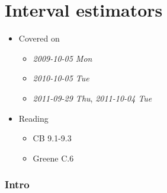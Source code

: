 
\part*{Interval estimators}%

\begin{itemize}
\item Covered on
\begin{itemize}
\item \textit{2009-10-05 Mon}
\item \textit{2010-10-05 Tue}
\item \textit{2011-09-29 Thu}, \textit{2011-10-04 Tue}
\end{itemize}
\item Reading
\begin{itemize}
\item CB 9.1-9.3
\item Greene C.6
\end{itemize}
\end{itemize}
\section{Intro}
\label{sec-1}

